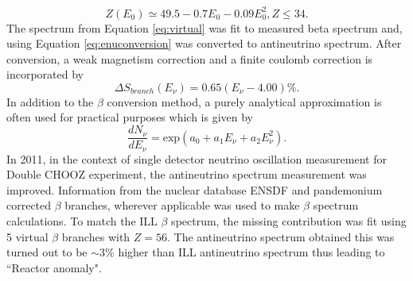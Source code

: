 \documentclass[11pt]{article}
\numberwithin{equation}{section}
\begin{document}
\begin{equation}
Z(E_{0}) \simeq 49.5 - 0.7 E_{0} - 0.09 E^{2}_{0}, Z \leq 34.
\end{equation}
The spectrum from Equation \ref{eq:virtual} was fit to measured beta spectrum and, using Equation \ref{eq:enuconversion} was converted to antineutrino spectrum. After conversion, a weak magnetism correction and a finite coulomb correction is incorporated by 
\begin{equation}
\Delta S_{branch}(E_{\nu}) = 0.65(E_{\nu} -4.00) \%.
\end{equation}
In addition to the $\beta$ conversion method, a purely analytical approximation \cite{vogel1989neutrino} is often used for practical purposes which is given by 
\begin{equation}
\frac{dN_{\nu}}{dE_{\nu}}=\text{exp}(a_{0}+a_{1} E_{\nu} + a_{2} E^{2}_{\nu}).
\end{equation}
In 2011, in the context of single detector neutrino oscillation measurement for Double CHOOZ experiment, the antineutrino spectrum measurement was improved. Information from the nuclear database ENSDF \cite{ensdf2003online} and pandemonium corrected $\beta$ branches, wherever applicable was used to make $\beta$ spectrum calculations. To match the ILL $\beta$ spectrum, the missing contribution was fit using 5 virtual $\beta$ branches with $Z=56$. The antineutrino spectrum obtained this was turned out to be $\sim$3$\%$ higher than ILL antineutrino spectrum thus leading to ``Reactor anomaly".
\end{document}
